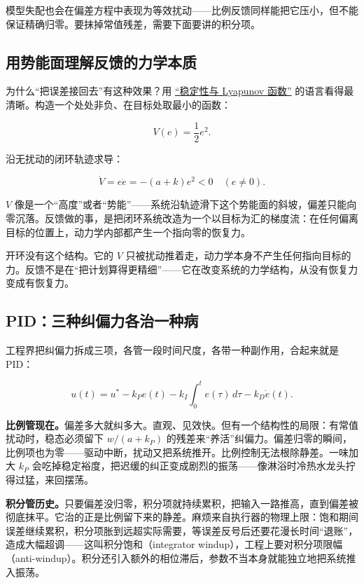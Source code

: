 模型失配也会在偏差方程中表现为等效扰动——比例反馈同样能把它压小，但不能保证精确归零。要抹掉常值残差，需要下面要讲的积分项。

\subsection{用势能面理解反馈的力学本质}

为什么``把误差接回去''有这种效果？用 \hyperref[sec:15-Differential-Equations-and-Dynamical-Systems/02-Stability-and-Dynamical-Systems/02]{``稳定性与 Lyapunov 函数''} 的语言看得最清晰。构造一个处处非负、在目标处取最小的函数：

\[
V(e) = \frac12 e^2.
\]

沿无扰动的闭环轨迹求导：

\[
\dot V = e \dot e = -(a + k) e^2 < 0 \quad (e \neq 0).
\]

\(V\) 像是一个``高度''或者``势能''——系统沿轨迹滑下这个势能面的斜坡，偏差只能向零沉落。反馈做的事，是把闭环系统改造为一个以目标为汇的梯度流：在任何偏离目标的位置上，动力学内部都产生一个指向零的恢复力。

开环没有这个结构。它的 \(V\) 只被扰动推着走，动力学本身不产生任何指向目标的力。反馈不是在``把计划算得更精细''——它在改变系统的力学结构，从没有恢复力变成有恢复力。

\subsection{PID：三种纠偏力各治一种病}

工程界把纠偏力拆成三项，各管一段时间尺度，各带一种副作用，合起来就是 PID：

\[
u(t) = u^* - k_P e(t) - k_I \int_0^t e(\tau)\, d\tau - k_D \dot e(t).
\]

\textbf{比例管现在。}偏差多大就纠多大。直观、见效快。但有一个结构性的局限：有常值扰动时，稳态必须留下 \(w/(a + k_P)\) 的残差来``养活''纠偏力。偏差归零的瞬间，比例项也为零——驱动中断，扰动又把系统推开。比例控制无法根除静差。一味加大 \(k_P\) 会吃掉稳定裕度，把迟缓的纠正变成剧烈的振荡——像淋浴时冷热水龙头拧得过猛，来回摆荡。

\textbf{积分管历史。}只要偏差没归零，积分项就持续累积，把输入一路推高，直到偏差被彻底抹平。它治的正是比例留下来的静差。麻烦来自执行器的物理上限：饱和期间误差继续累积，积分项胀到远超实际需要，等误差反号后还要花漫长时间``退账''，造成大幅超调——这叫积分饱和（integrator windup），工程上要对积分项限幅（anti-windup）。积分还引入额外的相位滞后，参数不当本身就能独立地把系统推入振荡。

